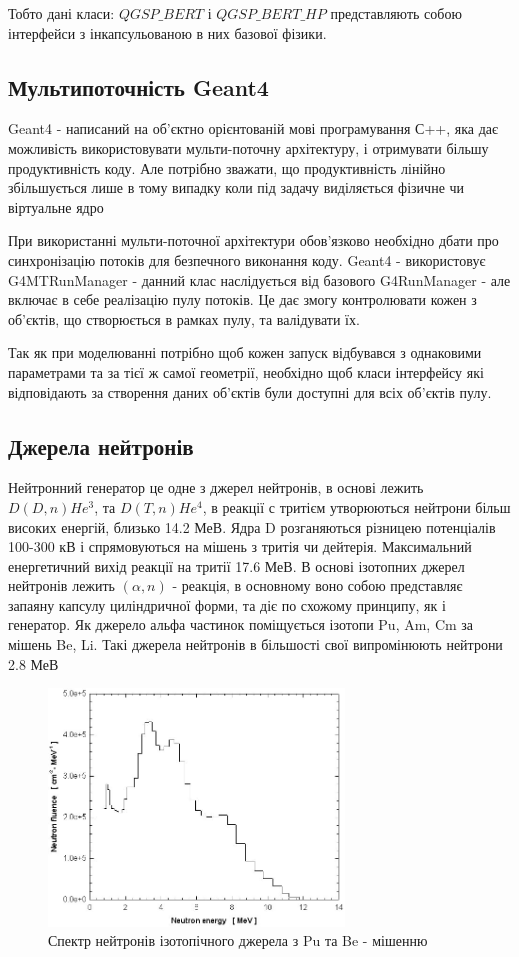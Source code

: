 \documentclass[a4paper, 14pt]{article}
\numberwithin{equation}{section}
\numberwithin{table}{section}
\begin{document}
	Тобто дані класи: $QGSP\_BERT$ і $QGSP\_BERT\_HP$ представляють собою інтерфейси з інкапсульованою в них базової фізики.
	
\subsection{Мультипоточність Geant4}
Geant4 - написаний на об'єктно орієнтованій мові програмування С++, яка дає можливість використовувати мульти-поточну архітектуру, і отримувати більшу продуктивність коду. Але потрібно зважати, що продуктивність лінійно збільшується лише в тому випадку коли під задачу виділяється фізичне чи віртуальне ядро 
	
При використанні мульти-поточної архітектури обов'язково необхідно дбати про синхронізацію потоків для безпечного виконання коду. Geant4 - використовує G4MTRunManager - данний клас наслідується від базового G4RunManager - але включає в себе реалізацію пулу потоків. Це дає змогу контролювати кожен з об'єктів, що створюється в рамках пулу, та валідувати їх. 

Так як при моделюванні потрібно щоб кожен запуск відбувався з однаковими параметрами та за тієї ж самої геометрії, необхідно щоб класи інтерфейсу які відповідають за створення даних об'єктів були доступні для всіх об'єктів пулу.
	
\subsection{Джерела нейтронів}
Нейтронний генератор це одне з джерел нейтронів, в основі лежить $D(D,n)He^3 $, та $D(T, n)He^4$, в реакції с тритієм утворюються нейтрони більш високих енергій, близько 14.2 МеВ. Ядра D розганяються різницею потенціалів 100-300 кВ і спрямовуються на мішень з тритія чи дейтерія. Максимальний енергетичний вихід реакції на тритії 17.6 МеВ. 
В основі ізотопних джерел нейтронів лежить $(\alpha, n)$ - реакція, в основному воно собою представляє запаяну капсулу циліндричної форми, та діє по схожому принципу, як і генератор. Як джерело альфа частинок поміщується ізотопи Pu, Am, Cm за мішень Be, Li. Такі джерела нейтронів в більшості свої випромінюють нейтрони 2.8 МеВ
\begin{figure}[hbt!]
	\centering \includegraphics[width=0.7\textwidth]{images/239-PuBe-neutron-source-spectrum.png}
	\caption{Спектр нейтронів ізотопічного джерела з Pu та Be - мішенню} 
	\label{ris:neutron28Spectrum}	
\end{figure}
	
\end{document}

